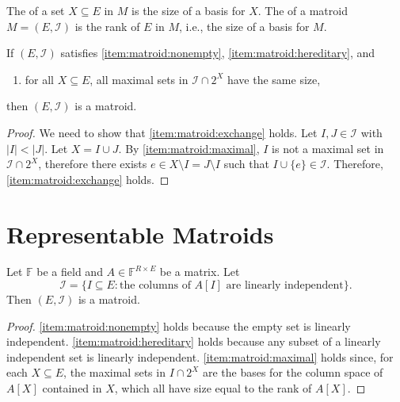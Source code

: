 \begin{definition}[Rank]
    The  of a set \(X \subseteq E\) in \(M\) is the size of a basis for \(X\).
    The  of a matroid \(M = (E, \mathcal{I})\) is the rank of \(E\) in \(M\), i.e., the size of a basis for \(M\).
\end{definition}

\begin{proposition}
    If \((E, \mathcal{I})\) satisfies \ref{item:matroid:nonempty}, \ref{item:matroid:hereditary}, and
    \begin{enumerate}[label = \textup{(I\arabic*)}, start = 4]
        \item for all \(X \subseteq E\), all maximal sets in \(\mathcal{I} \cap 2^X\) have the same size, \label{item:matroid:maximal}
    \end{enumerate}
    then \((E, \mathcal{I})\) is a matroid.
\end{proposition}

\begin{proof}
    We need to show that \ref{item:matroid:exchange} holds.
    Let \(I, J \in \mathcal{I}\) with \(|I| < |J|\).
    Let \(X = I \cup J\).
    By \ref{item:matroid:maximal}, \(I\) is not a maximal set in \(\mathcal{I} \cap 2^X\), therefore there exists \(e \in X \setminus I = J \setminus I\) such that \(I \cup \{e\} \in \mathcal{I}\).
    Therefore, \ref{item:matroid:exchange} holds.
\end{proof}

\section{Representable Matroids}

Let \(\mathbb{F}\) be a field and \(A \in \mathbb{F}^{R \times E}\) be a matrix.
Let
\begin{equation}
    \mathcal{I} = \{I \subseteq E : \text{the columns of } A[I] \text{ are linearly independent}\}.
\end{equation}
Then \((E, \mathcal{I})\) is a matroid.

\begin{proof}
    \ref{item:matroid:nonempty} holds because the empty set is linearly independent.
    \ref{item:matroid:hereditary} holds because any subset of a linearly independent set is linearly independent.
    \ref{item:matroid:maximal} holds since, for each \(X \subseteq E\), the maximal sets in \(I \cap 2^X\) are the bases for the column space of \(A[X]\) contained in \(X\), which all have size equal to the rank of \(A[X]\).
\end{proof}

